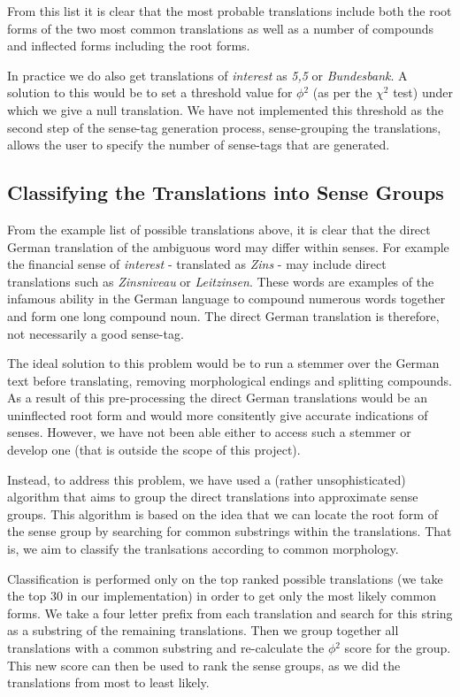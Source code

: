 \documentclass[a4wide,10pt]{article}
\begin{document}
\noindent From this list it is clear that the most probable translations 
include both the root forms of the two most common translations as well as 
a number of compounds and inflected forms including the root forms.    

In practice we do also get translations of {\it interest} as 
{\it 5,5} or {\it Bundesbank}. A solution to this would 
be to set a threshold value for $\phi$$^2$ (as per the $\chi$$^2$ test) under
which we give a null translation. We have not implemented this threshold 
as the second step of the sense-tag generation process, sense-grouping the
translations, allows the user to specify the number of sense-tags that 
are generated.

\subsection{Classifying the Translations into Sense Groups}

From the example list of possible translations above, it is clear that 
the direct German translation of the ambiguous word may differ within senses. 
For example the financial sense of {\it interest} - translated as {\it Zins} -
may include direct translations such as {\it Zinsniveau} or {\it Leitzinsen}.
These words are examples of the infamous ability in the German language to 
compound numerous words together and form one long compound noun. The 
direct German translation is therefore, not necessarily a good sense-tag.

The ideal solution to this problem would be to run a stemmer over the German 
text before translating, removing morphological endings and splitting 
compounds. As a result of this pre-processing the direct German translations 
would be an uninflected root form and would more consitently give accurate 
indications of senses. However, we have not been able either to access such a 
stemmer or develop one (that is outside the scope of this project).    

Instead, to address this problem, we have used a (rather unsophisticated)
algorithm that aims to group the direct translations into approximate sense 
groups. This algorithm is based on the idea that we can locate the 
root form of the sense group by searching for common substrings within the
translations. That is, we aim to classify the tranlsations according to 
common morphology. 

Classification is performed only on the top ranked possible translations 
(we take the top 30 in our implementation) in order to get only the
most likely common forms. We take a four letter prefix from each translation
and search for this string as a substring of the remaining translations. 
Then we group together all translations with a common substring and 
re-calculate the $\phi$$^2$ score for the group. This new score can then 
be used to rank the sense groups, as we did the translations from most to least
likely.    
 
\end{document}
